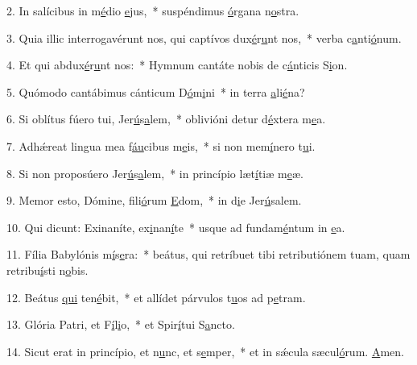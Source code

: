 2. In salícibus in m\uline{é}dio \uline{e}jus,~* suspéndimus \uline{ó}rgana n\uline{o}stra.\par 
3. Quia illic interrogavérunt nos, qui captívos dux\uline{é}r\uline{u}nt nos,~* verba c\uline{a}nti\uline{ó}num.\par 
4. Et qui abdux\uline{é}r\uline{u}nt nos:~* Hymnum cantáte nobis de c\uline{á}nticis S\uline{i}on.\par 
5. Quómodo cantábimus cánticum D\uline{ó}m\uline{i}ni~* in terra \uline{a}li\uline{é}na?\par 
6. Si oblítus fúero tui, Jer\uline{ú}s\uline{a}lem,~* oblivióni detur d\uline{é}xtera m\uline{e}a.\par 
7. Adhǽreat lingua mea f\uline{áu}cibus m\uline{e}is,~* si non mem\uline{í}nero t\uline{u}i.\par 
8. Si non proposúero Jer\uline{ú}s\uline{a}lem,~* in princípio læt\uline{í}tiæ m\uline{e}æ.\par 
9. Memor esto, Dómine, fili\uline{ó}rum \uline{E}dom,~* in d\uline{i}e Jer\uline{ú}salem.\par 
10. Qui dicunt: Exinaníte, ex\uline{i}nan\uline{í}te~* usque ad fundam\uline{é}ntum in \uline{e}a.\par 
11. Fília Babylónis m\uline{í}s\uline{e}ra:~* beátus, qui retríbuet tibi retributiónem tuam, quam retribu\uline{í}sti n\uline{o}bis.\par 
12. Beátus \uline{qui} ten\uline{é}bit,~* et allídet párvulos t\uline{u}os ad p\uline{e}tram.\par 
13. Glória Patri, et F\uline{í}l\uline{i}o,~* et Spir\uline{í}tui S\uline{a}ncto.\par 
14. Sicut erat in princípio, et n\uline{u}nc, et s\uline{e}mper,~* et in sǽcula sæcul\uline{ó}rum. \uline{A}men.\par 
